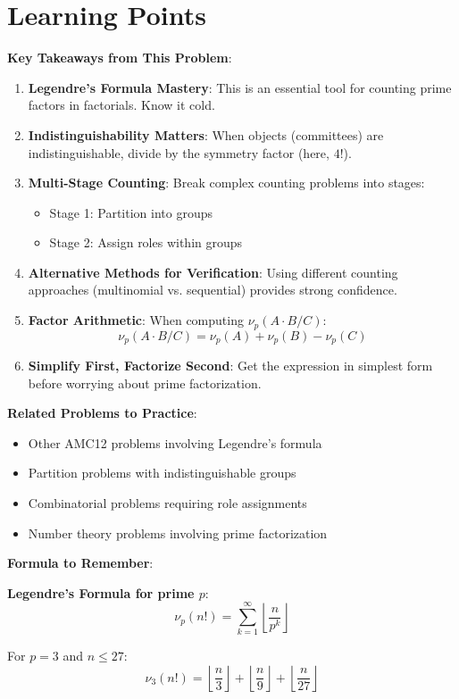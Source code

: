 \documentclass[12pt]{article}
\begin{document}
\section*{Learning Points}

\textbf{Key Takeaways from This Problem}:

\begin{enumerate}
    \item \textbf{Legendre's Formula Mastery}: This is an essential tool for counting prime factors in factorials. Know it cold.
    
    \item \textbf{Indistinguishability Matters}: When objects (committees) are indistinguishable, divide by the symmetry factor (here, $4!$).
    
    \item \textbf{Multi-Stage Counting}: Break complex counting problems into stages:
    \begin{itemize}
        \item Stage 1: Partition into groups
        \item Stage 2: Assign roles within groups
    \end{itemize}
    
    \item \textbf{Alternative Methods for Verification}: Using different counting approaches (multinomial vs. sequential) provides strong confidence.
    
    \item \textbf{Factor Arithmetic}: When computing $\nu_p(A \cdot B / C)$:
    $$\nu_p(A \cdot B / C) = \nu_p(A) + \nu_p(B) - \nu_p(C)$$
    
    \item \textbf{Simplify First, Factorize Second}: Get the expression in simplest form before worrying about prime factorization.
\end{enumerate}

\vspace{0.5cm}

\textbf{Related Problems to Practice}:
\begin{itemize}
    \item Other AMC12 problems involving Legendre's formula
    \item Partition problems with indistinguishable groups
    \item Combinatorial problems requiring role assignments
    \item Number theory problems involving prime factorization
\end{itemize}

\vspace{0.5cm}

\textbf{Formula to Remember}:

\textbf{Legendre's Formula for prime $p$}:
$$\nu_p(n!) = \sum_{k=1}^{\infty} \left\lfloor \frac{n}{p^k} \right\rfloor$$

For $p=3$ and $n \leq 27$:
$$\nu_3(n!) = \left\lfloor \frac{n}{3} \right\rfloor + \left\lfloor \frac{n}{9} \right\rfloor + \left\lfloor \frac{n}{27} \right\rfloor$$
\end{document}
